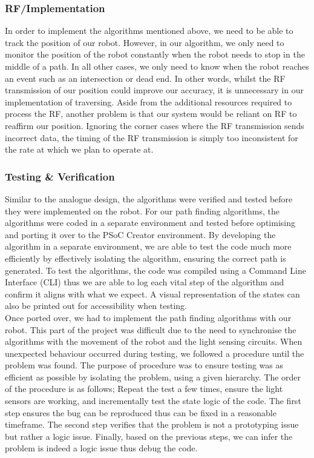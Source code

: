 \subsubsection*{RF/Implementation}
In order to implement the algorithms mentioned above, we need to be able to track the position of our robot. However, in our algorithm, we only need to monitor the position of the robot constantly when the robot needs to stop in the middle of a path. In all other cases, we only need to know when the robot reaches an event such as an intersection or dead end. In other words, whilst the RF transmission of our position could improve our accuracy, it is unnecessary in our implementation of traversing. Aside from the additional resources required to process the RF, another problem is that our system would be reliant on RF to reaffirm our position. Ignoring the corner cases where the RF transmission sends incorrect data, the timing of the RF transmission is simply too inconsistent for the rate at which we plan to operate at.

\subsubsection*{Testing \& Verification}
Similar to the analogue design, the algorithms were verified and tested before they were implemented on the robot. For our path finding algorithms, the algorithms were coded in a separate environment and tested before optimising and porting it over to the PSoC Creator environment. By developing the algorithm in a separate environment, we are able to test the code much more efficiently by effectively isolating the algorithm, ensuring the correct path is generated. To test the algorithms, the code was compiled using a Command Line Interface (CLI) thus we are able to log each vital step of the algorithm and confirm it aligns with what we expect. A visual representation of the states can also be printed out for accessibility when testing.
\\Once ported over, we had to implement the path finding algorithms with our robot. This part of the project was difficult due to the need to synchronise the algorithms with the movement of the robot and the light sensing circuits. When unexpected behaviour occurred during testing, we followed a procedure until the problem was found. The purpose of procedure was to ensure testing was as efficient as possible by isolating the problem, using a given hierarchy. The order of the procedure is as follows; Repeat the test a few times, ensure the light sensors are working, and incrementally test the state logic of the code.  The first step ensures the bug can be reproduced thus can be fixed in a reasonable timeframe. The second step verifies that the problem is not a prototyping issue but rather a logic issue. Finally, based on the previous steps, we can infer the problem is indeed a logic issue thus debug the code.